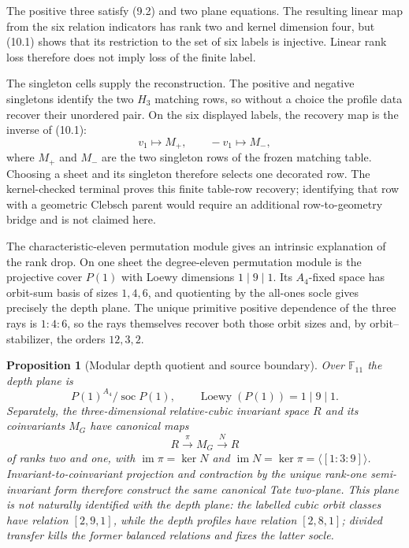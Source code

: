 \documentclass[11pt]{article}
\newtheorem{proposition}[theorem]{Proposition}
\theoremstyle{definition}
\theoremstyle{remark}
\newcommand{\F}{\mathbb{F}}
\begin{document}
The positive three satisfy (9.2) and two plane equations.  The resulting
linear map from the six relation indicators has rank two and kernel
dimension four, but (10.1) shows that its restriction to the set of six
labels is injective.  Linear rank loss therefore does not imply loss of the
finite label.

The singleton cells supply the reconstruction.  The positive and negative
singletons identify the two $H_3$ matching rows, so without a choice the
profile data recover their unordered pair.  On the six displayed labels,
the recovery map is the inverse of (10.1):
\[
 v_1\longmapsto M_+,\qquad -v_1\longmapsto M_-,
\]
where $M_+$ and $M_-$ are the two singleton rows of the frozen matching
table.  Choosing
a sheet and its singleton therefore selects one decorated row.  The
kernel-checked terminal proves this finite table-row recovery; identifying
that row with a geometric Clebsch parent would require an additional
row-to-geometry bridge and is not claimed here.

The characteristic-eleven permutation module gives an intrinsic
explanation of the rank drop.  On one sheet the degree-eleven permutation
module is the projective cover $P(1)$ with Loewy dimensions $1\mid9\mid1$.
Its $A_4$-fixed space has orbit-sum basis of sizes $1,4,6$, and quotienting
by the all-ones socle gives precisely the depth plane.  The unique primitive
positive dependence of the three rays is $1:4:6$, so the rays themselves
recover both those orbit sizes and, by orbit--stabilizer, the orders
$12,3,2$.

\begin{proposition}[Modular depth quotient and source boundary]
\label{prop:modular-depth-plane}
Over $\F_{11}$ the depth plane is
\[
  P(1)^{A_4}/\operatorname{soc}P(1),\qquad
  \operatorname{Loewy}(P(1))=1\mid9\mid1.
\]
Separately, the three-dimensional relative-cubic invariant space $R$ and
its coinvariants $M_G$ have canonical maps
\[
 R\xrightarrow{\ \pi\ }M_G\xrightarrow{\ N\ }R
\]
of ranks two and one, with
$\operatorname{im}\pi=\ker N$ and
$\operatorname{im}N=\ker\pi=\langle[1:3:9]\rangle$.
Invariant-to-coinvariant projection and contraction by the unique
rank-one semi-invariant form therefore construct the same canonical Tate
two-plane.  This plane is not naturally identified with the depth plane:
the labelled cubic orbit classes have relation $[2,9,1]$, while the depth
profiles have relation $[2,8,1]$; divided transfer kills the former
balanced relations and fixes the latter socle.
\end{proposition}
\end{document}
